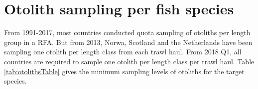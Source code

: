 \documentclass[a4paper 12pt]{article}
\numberwithin{equation}{section}
\begin{document}
\section{\large Otolith sampling per fish species}
\label{secAp:otolithappendix}
From 1991-2017, most countries conducted quota sampling of otoliths per length group in a RFA. But from 2013, Norwa, Scotland and the Netherlands have been sampling one otolith per length class from each trawl haul. From 2018 Q1, all countries are required to sample one otolith per length class per trawl haul.  Table \ref{tab:otolithsTable} gives the minimum sampling levels of otoliths for the target species.\\ %
\end{document}
